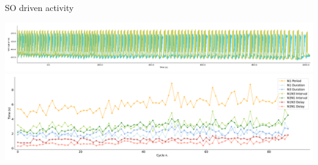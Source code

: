 \documentclass[aspectratio=43]{beamer}
\begin{document}
\begin{frame}{SO driven activity}
{		\begin{minipage}[c]{0.1\textwidth} %
			\centering
		\end{minipage}%
		\begin{minipage}[c]{0.85\textwidth}
			\centering
			\includegraphics[width=\textwidth]{invariants/data/SUSSEX/prep4_so_driven_2/images/_signal_intervals_zoom.png}\\
			\includegraphics[width=\textwidth]{invariants/data/SUSSEX/prep4_so_driven_2/images/_time_cycle.pdf}
		\end{minipage}

}
\end{frame}
\end{document}
